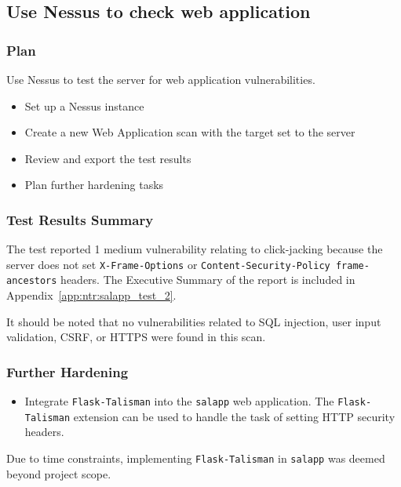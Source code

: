 \pagebreak
\subsection{Use Nessus to check web application}
\subsubsection*{Plan}
Use Nessus to test the server for web application vulnerabilities.
\begin{itemize}
  \item Set up a Nessus instance
  \item Create a new Web Application scan with the target set to the server
  \item Review and export the test results
  \item Plan further hardening tasks
\end{itemize}
\subsubsection*{Test Results Summary}
The test reported 1 medium vulnerability relating to click-jacking because the server does not set \texttt{X-Frame-Options} or \texttt{Content-Security-Policy frame-ancestors} headers. The Executive Summary of the report is included in Appendix~\ref{app:ntr:salapp_test_2}.

It should be noted that no vulnerabilities related to SQL injection, user input validation, CSRF, or HTTPS were found in this scan.
\subsubsection*{Further Hardening}
\begin{itemize}
  \item Integrate \texttt{Flask-Talisman} into the \texttt{salapp} web application. The \texttt{Flask-Talisman} extension can be used to handle the task of setting HTTP security headers.
\end{itemize}

\noindent\textcolor{deep-gray}{Due to time constraints, implementing \texttt{Flask-Talisman} in \texttt{salapp} was deemed beyond project scope.}

%
%
%
